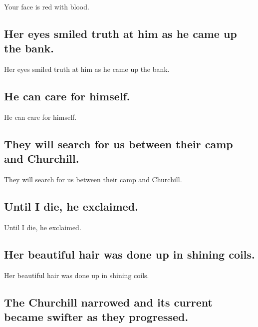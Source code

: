 \documentclass[]{article}
\begin{document}
Your face is red with blood.

\hypertarget{her-eyes-smiled-truth-at-him-as-he-came-up-the-bank.}{%
\subsection{Her eyes smiled truth at him as he came up the
bank.}\label{her-eyes-smiled-truth-at-him-as-he-came-up-the-bank.}}

Her eyes smiled truth at him as he came up the bank.

\hypertarget{he-can-care-for-himself.}{%
\subsection{He can care for himself.}\label{he-can-care-for-himself.}}

He can care for himself.

\hypertarget{they-will-search-for-us-between-their-camp-and-churchill.}{%
\subsection{They will search for us between their camp and
Churchill.}\label{they-will-search-for-us-between-their-camp-and-churchill.}}

They will search for us between their camp and Churchill.

\hypertarget{until-i-die-he-exclaimed.}{%
\subsection{Until I die, he
exclaimed.}\label{until-i-die-he-exclaimed.}}

Until I die, he exclaimed.

\hypertarget{her-beautiful-hair-was-done-up-in-shining-coils.}{%
\subsection{Her beautiful hair was done up in shining
coils.}\label{her-beautiful-hair-was-done-up-in-shining-coils.}}

Her beautiful hair was done up in shining coils.

\hypertarget{the-churchill-narrowed-and-its-current-became-swifter-as-they-progressed.}{%
\subsection{The Churchill narrowed and its current became swifter as
they
progressed.}\label{the-churchill-narrowed-and-its-current-became-swifter-as-they-progressed.}}
\end{document}
